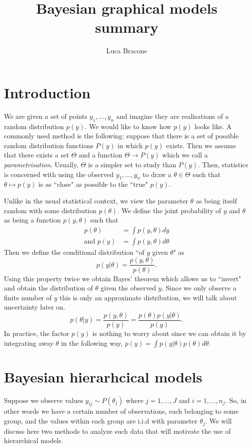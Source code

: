\documentclass{scrartcl}
\author{Luca Bracone}
\title{Bayesian graphical models summary}
\begin{document}
\maketitle
\section{Introduction}
We are given a set of points $y_1, \dots, y_n$ and imagine they are
realisations of a random distribution $p(y)$.
We would like to know how $p(y)$ looks like.
A commonly used method is the following: suppose that there is a set of
possible random distribution functions $P(y)$ in which $p(y)$ exists.
Then we assume that there exists a set $\Theta$ and a function $\Theta \to P(y)$
which we call a \emph{parametrisation}.
Usually, $\Theta$ is a simpler set to study than $P(y)$.
Then, statistics is concerned with using the observed $y_1,\dots,y_n$ to draw a
$\theta \in \Theta$ such that $\theta \mapsto p(y)$ is as ``close" as possible
to the ``true" $p(y)$.

Unlike in the usual statistical context, we view the parameter $\theta$ as
being itself random with some distribution $p(\theta)$. We define the joint
probability of $y$ and $\theta$ as being a function $p(y,\theta)$ such that
\begin{align*}
	p(\theta)        & = \int p(y,\theta) dy      \\
	\text{and } p(y) & = \int p(y,\theta) d\theta
\end{align*}
Then we define the conditional distribution ``of $y$ given $\theta$" as
\[
	p(y|\theta) = \frac{p(y,\theta)}{p(\theta)}.
\]
Using this property twice we obtain Bayes' theorem which allows us to ``invert"
and obtain the distribution of $\theta$ given the observed $y$. Since we only
observe a finite number of $y$ this is only an approximate distribution, we
will talk about uncertainty later on.
\[
	p(\theta|y) = \frac{p(y,\theta)}{p(y)} = \frac{p(\theta)p(y|\theta)}{p(y)}.
\]
In practice, the factor $p(y)$ is nothing to worry about since we can obtain it
by integrating away $\theta$ in the following way, $p(y) = \int
	p(y|\theta)p(\theta)d\theta$.

\section{Bayesian hierarhcical models}
Suppose we observe values $y_{ij} \sim P(\theta_j)$ where $j=1,\dots,J$ and
$i=1,\dots,n_j$. So, in other words we have a certain number of observations,
each belonging to some group, and the values within each group are i.i.d with
parameter $\theta_j$. We will discuss here two methods to analyze such data
that will motivate the use of hierarchical models.
\end{document}

